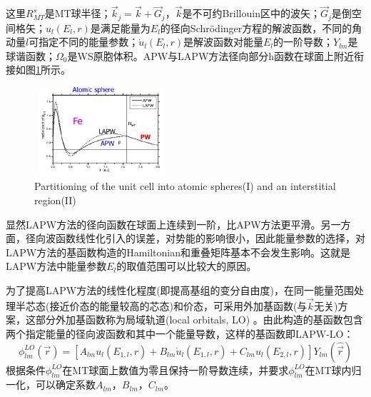 {这里$R_{MT}^s$是MT球半径；$\vec k_j=\vec k+\vec G_j$，$\vec k$是不可约Brillouin区中的波矢；$\vec G_j$是倒空间格矢；$u_l(E_l,r)$是满足能量为$E_l$的径向Schr\"odinger方程的解波函数，不同的角动量$l$可指定不同的能量参数；$\dot u_l(E_l,r)$是解波函数对能量$E_l$的一阶导数；$Y_{lm}$是球谐函数；$\Omega_0$是WS原胞体积。APW与LAPW方法径向部分h函数在球面上附近衔接如图\ref{Muffin_tin}所示。
\begin{figure}[h!]
\centering
\includegraphics[height=1.30in,width=1.98in,viewport=1 20 585 435,clip]{Figures/WIEN2k-LAPW.png}
\caption{\small \textrm{Partitioning of the unit cell into atomic spheres(I) and an interstitial region(II)}}%
\label{Muffin_tin}
\end{figure}
显然LAPW方法的径向函数在球面上连续到一阶，比APW方法更平滑。另一方面，径向波函数线性化引入的误差，对势能的影响很小，因此能量参数的选择，对LAPW方法的基函数构造的Hamiltonian和重叠矩阵基本不会发生影响。这就是LAPW方法中能量参数$E_l$的取值范围可以比较大的原因。%

为了提高LAPW方法的线性化程度(即提高基组的变分自由度)，在同一能量范围处理半芯态(接近价态的能量较高的芯态)和价态，可采用外加基函数(与$\vec k$无关)方案，这部分外加基函数称为局域轨道(local orbitals, LO)%
。由此构造的基函数包含两个指定能量的径向波函数和其中一个能量导数，这样的基函数即LAPW-LO：
\begin{equation}
  \phi_{lm}^{LO}(\vec r)=[A_{lm}u_l(E_{1,l},r)+B_{lm}\dot u_l(E_{1,l},r)+C_{lm}u_l(E_{2,l},r)]Y_{lm}(\hat{\vec r})
  \label{eq:LAPW-LO}
\end{equation}
根据条件$\phi_{lm}^{LO}$在MT球面上数值为零且保持一阶导数连续，并要求$\phi_{lm}^{LO}$在MT球内归一化，可以确定系数$A_{lm}$，$B_{lm}$，$C_{lm}$。

}
